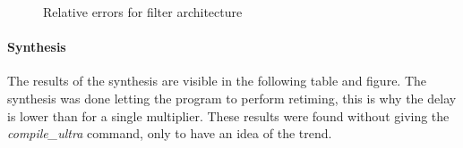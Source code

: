 \documentclass[a4paper]{article}
\begin{document}
		\begin{figure}[H]
			\centering
			\hfill
			\caption{Relative errors for filter architecture}
		\end{figure}

	\paragraph*{Synthesis} The results of the synthesis are visible in the following table and figure. The synthesis was done letting the program to perform retiming, this is why the delay is lower than for a single multiplier. These results were found without giving the \textit{compile\_ultra} command, only to have an idea of the trend.
\end{document}
